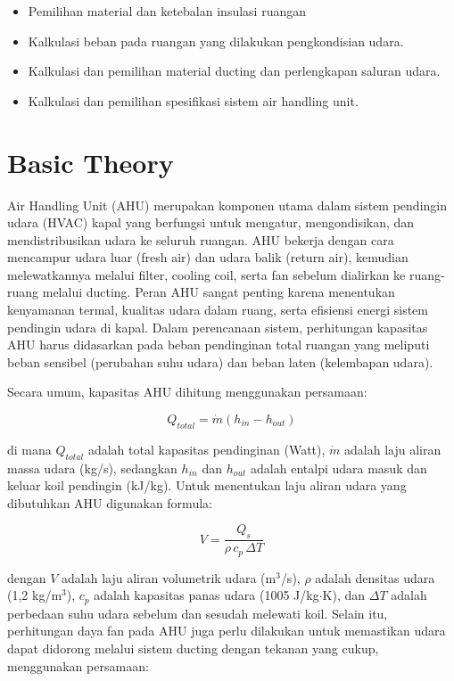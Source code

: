 \documentclass[12pt,a4paper,twoside,openright]{book}
\theoremstyle{definition}
\theoremstyle{plain}
\theoremstyle{remark}
\begin{document}
\begin{itemize}
  \item Pemilihan material dan ketebalan insulasi ruangan
  \item Kalkulasi beban pada ruangan yang dilakukan pengkondisian udara.
  \item Kalkulasi dan pemilihan material ducting dan perlengkapan saluran udara.
  \item Kalkulasi dan pemilihan spesifikasi sistem air handling unit.
\end{itemize}

\section{Basic Theory}

Air Handling Unit (AHU) merupakan komponen utama dalam sistem pendingin udara (HVAC) kapal yang berfungsi untuk mengatur, mengondisikan, dan mendistribusikan udara ke seluruh ruangan. AHU bekerja dengan cara mencampur udara luar (fresh air) dan udara balik (return air), kemudian melewatkannya melalui filter, cooling coil, serta fan sebelum dialirkan ke ruang-ruang melalui ducting. Peran AHU sangat penting karena menentukan kenyamanan termal, kualitas udara dalam ruang, serta efisiensi energi sistem pendingin udara di kapal. Dalam perencanaan sistem, perhitungan kapasitas AHU harus didasarkan pada beban pendinginan total ruangan yang meliputi beban sensibel (perubahan suhu udara) dan beban laten (kelembapan udara).

Secara umum, kapasitas AHU dihitung menggunakan persamaan:

\begin{equation}
Q_{total} = \dot{m} \left( h_{in} - h_{out} \right)
\end{equation}

di mana $Q_{total}$ adalah total kapasitas pendinginan (Watt), $\dot{m}$ adalah laju aliran massa udara (kg/s), sedangkan $h_{in}$ dan $h_{out}$ adalah entalpi udara masuk dan keluar koil pendingin (kJ/kg). Untuk menentukan laju aliran udara yang dibutuhkan AHU digunakan formula:

\begin{equation}
V = \dfrac{Q_s}{\rho \, c_p \, \Delta T}
\end{equation}

dengan $V$ adalah laju aliran volumetrik udara (m$^3$/s), $\rho$ adalah densitas udara (1,2 kg/m$^3$), $c_p$ adalah kapasitas panas udara (1005 J/kg$\cdot$K), dan $\Delta T$ adalah perbedaan suhu udara sebelum dan sesudah melewati koil. Selain itu, perhitungan daya fan pada AHU juga perlu dilakukan untuk memastikan udara dapat didorong melalui sistem ducting dengan tekanan yang cukup, menggunakan persamaan:
\end{document}
